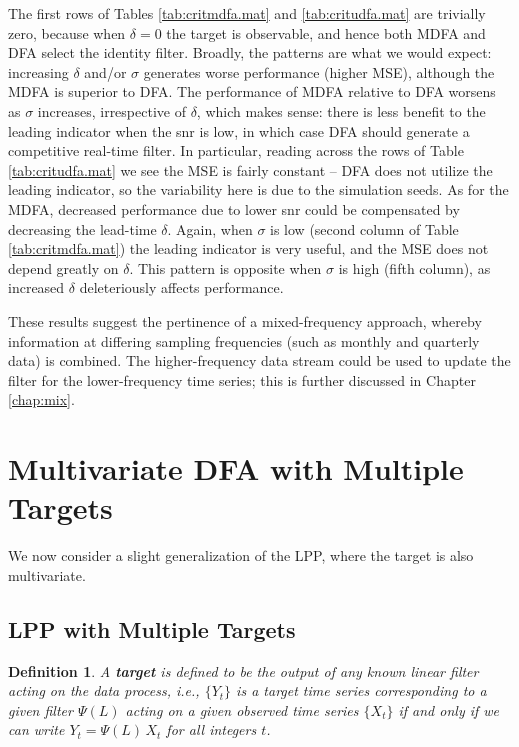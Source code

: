 \documentclass[a4paper]{book}
\newtheorem{Definition}{Definition}
\begin{document}
 The first rows of Tables \ref{tab:critmdfa.mat} and \ref{tab:critudfa.mat}
 are trivially zero, because when $\delta = 0$ the target is observable,
 and hence both MDFA and DFA select the identity filter.  
 Broadly, the patterns are what we would expect: increasing $\delta$ and/or
 $\sigma$ generates worse performance (higher MSE), although the MDFA is
 superior to DFA.  The performance of MDFA relative to DFA worsens as 
 $\sigma$ increases, irrespective of $\delta$, which makes sense: there
 is less benefit to the leading indicator when the snr is low, in which
 case DFA should generate a competitive real-time filter.
  In particular, reading across the rows of Table \ref{tab:critudfa.mat}
 we see the MSE is fairly constant -- DFA does not utilize the leading indicator,
 so the variability here is due to the simulation seeds.
  As for the MDFA, decreased performance due to lower snr could be 
 compensated by decreasing the lead-time $\delta$.  
  Again, when $\sigma$ is low (second column of Table \ref{tab:critmdfa.mat})
  the leading indicator is very useful, and the MSE does not depend 
 greatly on $\delta$.  This pattern is opposite when $\sigma$ is high 
 (fifth column), as increased $\delta$ deleteriously affects performance.

   
These results suggest the pertinence of a mixed-frequency approach,
 whereby information at differing sampling frequencies (such as monthly
 and quarterly data) is combined.  The higher-frequency data stream
 could be used to update the filter for the lower-frequency time series;
 this is further discussed in Chapter \ref{chap:mix}. 
 


\section{Multivariate DFA with Multiple Targets}
 
  
 We now consider a slight generalization of the LPP, where the target is also multivariate.
 
\subsection{LPP with Multiple Targets} 
 
\begin{Definition} \rm
\label{def:target2}
 A {\bf target} is defined to be the output of any known linear
 filter acting on the data process, i.e.,  $\{Y_t \}$ is a target
 time series corresponding to a given filter $\Psi (L)$ acting on a 
given observed time series
 $\{ X_t \}$ if and only if we can write $ Y_t = \Psi (L) \, X_t$
 for all integers $t$.
\end{Definition}
\end{document}
